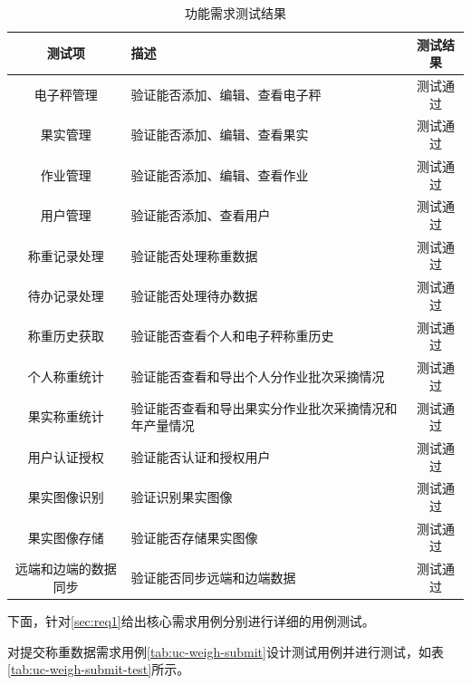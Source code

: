 \newpage
\begin{longtable}[ht]{|c|p{8cm}|c|}
\caption{功能需求测试结果}
\label{tab:test-req-summary}
\\
\hline
测试项 & 描述 & 测试结果 \\\hline
电子秤管理 & 验证能否添加、编辑、查看电子秤 & 测试通过 \\\hline
果实管理 & 验证能否添加、编辑、查看果实 & 测试通过 \\\hline
作业管理 & 验证能否添加、编辑、查看作业 & 测试通过 \\\hline
用户管理 & 验证能否添加、查看用户 & 测试通过 \\\hline
称重记录处理 & 验证能否处理称重数据 & 测试通过 \\\hline
待办记录处理 & 验证能否处理待办数据 & 测试通过 \\\hline
称重历史获取 & 验证能否查看个人和电子秤称重历史 & 测试通过 \\\hline
个人称重统计 & 验证能否查看和导出个人分作业批次采摘情况 & 测试通过 \\\hline
果实称重统计 & 验证能否查看和导出果实分作业批次采摘情况和年产量情况 & 测试通过 \\\hline
用户认证授权 & 验证能否认证和授权用户 & 测试通过 \\\hline
果实图像识别 & 验证识别果实图像 & 测试通过 \\\hline
果实图像存储 & 验证能否存储果实图像 & 测试通过  \\\hline
远端和边端的数据同步 & 验证能否同步远端和边端数据 & 测试通过  \\\hline
\end{longtable}

下面，针对\ref{sec:req1}给出核心需求用例分别进行详细的用例测试。

对提交称重数据需求用例\ref{tab:uc-weigh-submit}设计测试用例并进行测试，如表\ref{tab:uc-weigh-submit-test}所示。


